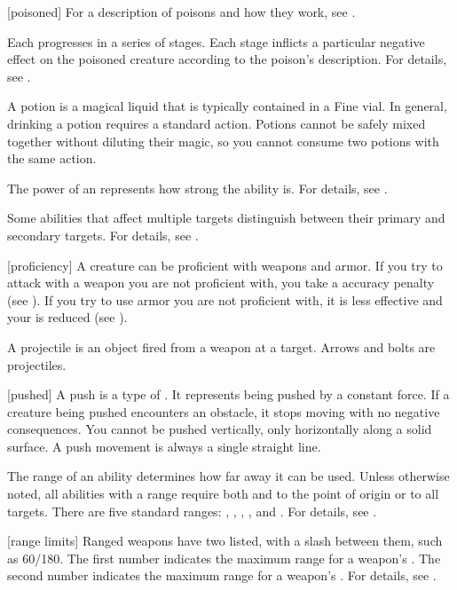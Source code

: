[poisoned] For a description of poisons and how they work, see .

 Each  progresses in a series of stages.
Each stage inflicts a particular negative effect on the poisoned creature according to the poison's description.
For details, see .

 A potion is a magical liquid that is typically contained in a Fine vial.
In general, drinking a potion requires a standard action.
Potions cannot be safely mixed together without diluting their magic, so you cannot consume two potions with the same action.

 The power of an  represents how strong the ability is.
For details, see .

 Some abilities that affect multiple targets distinguish between their primary and secondary targets.
For details, see .

[proficiency] A creature can be proficient with weapons and armor.
If you try to attack with a weapon you are not proficient with, you take a  accuracy penalty (see ).
If you try to use armor you are not proficient with, it is less effective and your  is reduced (see ).

 A projectile is an object fired from a weapon at a target.
Arrows and bolts are projectiles.

[pushed] A push is a type of .
It represents being pushed by a constant force.
If a creature being pushed encounters an obstacle, it stops moving with no negative consequences.
You cannot be pushed vertically, only horizontally along a solid surface.
A push movement is always a single straight line.

 The range of an ability determines how far away it can be used.
Unless otherwise noted, all abilities with a range require both  and  to the point of origin or to all targets.
There are five standard ranges: \shortrange, \medrange, \longrange, \distrange, and \extrange.
For details, see .

[range limits] Ranged weapons have two  listed, with a slash between them, such as 60/180.
The first number indicates the maximum range for a weapon's .
The second number indicates the maximum range for a weapon's .
For details, see .

